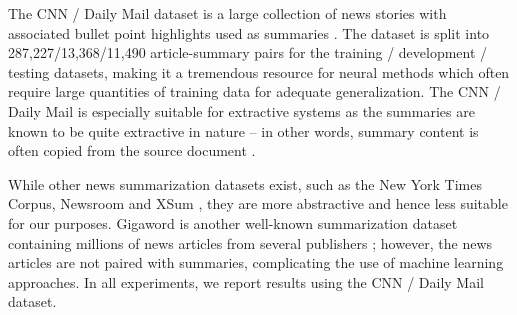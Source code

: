 The CNN / Daily Mail dataset is a large collection of news stories with associated bullet point highlights used as summaries \parencite{hermann2015teaching}. The dataset is split into 287,227/13,368/11,490 article-summary pairs for the training / development / testing datasets, making it a tremendous resource for neural methods which often require large quantities of training data for adequate generalization. The CNN / Daily Mail is especially suitable for extractive systems as the summaries are known to be quite extractive in nature -- in other words, summary content is often copied from the source document  \parencite{grusky2018newsroom}. 

While other news summarization datasets exist, such as the New York Times Corpus, Newsroom and XSum \parencite{nyt-corpus, grusky2018newsroom, xsum}, they are more abstractive and hence less suitable for our purposes. 
Gigaword is another well-known summarization dataset containing millions of news articles from several publishers \parencite{napoles-etal-2012-annotated}; however, the news articles are not paired with summaries, complicating the use of machine learning approaches.
In all experiments, we report results using the CNN / Daily Mail dataset.